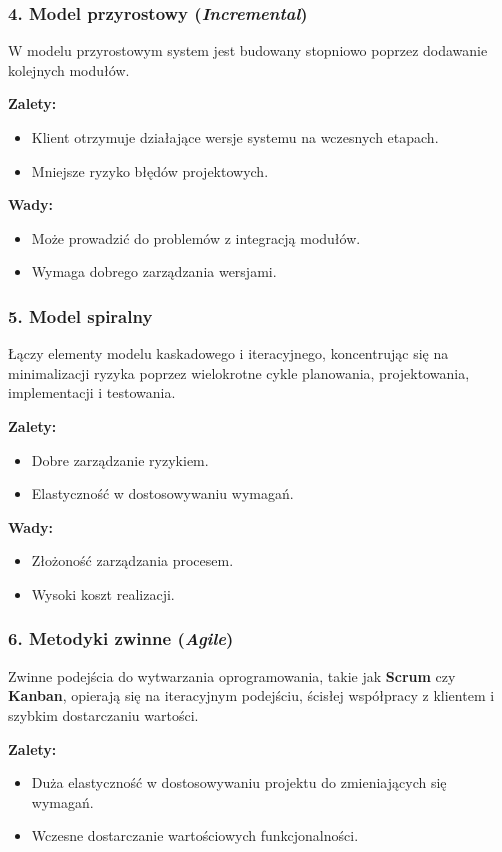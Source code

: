 \subsubsection{4. Model przyrostowy (\textit{Incremental})}
W modelu przyrostowym system jest budowany stopniowo poprzez dodawanie kolejnych modułów.

\textbf{Zalety:}
\begin{itemize}
    \item Klient otrzymuje działające wersje systemu na wczesnych etapach.
    \item Mniejsze ryzyko błędów projektowych.
\end{itemize}

\textbf{Wady:}
\begin{itemize}
    \item Może prowadzić do problemów z integracją modułów.
    \item Wymaga dobrego zarządzania wersjami.
\end{itemize}

\subsubsection{5. Model spiralny}
Łączy elementy modelu kaskadowego i iteracyjnego, koncentrując się na minimalizacji ryzyka poprzez wielokrotne cykle planowania, projektowania, implementacji i testowania.

\textbf{Zalety:}
\begin{itemize}
    \item Dobre zarządzanie ryzykiem.
    \item Elastyczność w dostosowywaniu wymagań.
\end{itemize}

\textbf{Wady:}
\begin{itemize}
    \item Złożoność zarządzania procesem.
    \item Wysoki koszt realizacji.
\end{itemize}

\subsubsection{6. Metodyki zwinne (\textit{Agile})}
Zwinne podejścia do wytwarzania oprogramowania, takie jak \textbf{Scrum} czy \textbf{Kanban}, opierają się na iteracyjnym podejściu, ścisłej współpracy z klientem i szybkim dostarczaniu wartości.

\textbf{Zalety:}
\begin{itemize}
    \item Duża elastyczność w dostosowywaniu projektu do zmieniających się wymagań.
    \item Wczesne dostarczanie wartościowych funkcjonalności.
\end{itemize}


